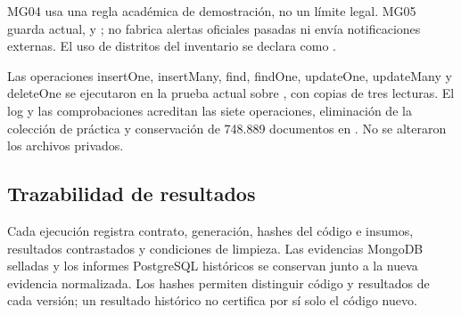 MG04 usa una regla académica de demostración, no un límite legal. MG05 guarda
 actual,  y
; no fabrica alertas oficiales pasadas
ni envía notificaciones externas. El uso de distritos del inventario se declara
como .

Las operaciones insertOne, insertMany, find, findOne, updateOne, updateMany y
deleteOne se ejecutaron en la prueba actual sobre , con
copias de tres lecturas. El log y las comprobaciones acreditan las siete
operaciones, eliminación de la colección de práctica y conservación de 748.889
documentos en . No se alteraron los archivos privados.




\subsection{Trazabilidad de resultados}
Cada ejecución registra contrato, generación, hashes del código e insumos,
resultados contrastados y condiciones de limpieza. Las evidencias MongoDB
selladas y los informes PostgreSQL históricos se conservan junto a la nueva
evidencia normalizada. Los hashes permiten distinguir código y resultados de
cada versión; un resultado histórico no certifica por sí solo el código nuevo.
